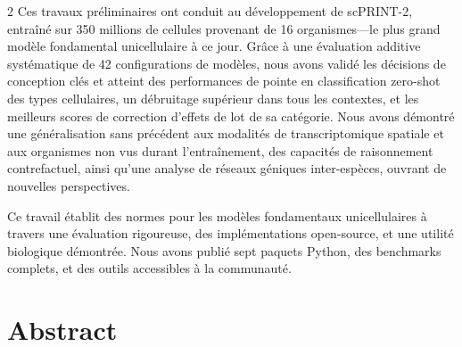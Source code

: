 \begin{mdframed}
\begin{small}
\begin{multicols}{2}
Ces travaux préliminaires ont conduit au développement de scPRINT-2, entraîné sur 350 millions de cellules provenant de 16 organismes—le plus grand modèle fondamental unicellulaire à ce jour. Grâce à une évaluation additive systématique de 42 configurations de modèles, nous avons validé les décisions de conception clés et atteint des performances de pointe en classification zero-shot des types cellulaires, un débruitage supérieur dans tous les contextes, et les meilleurs scores de correction d'effets de lot de sa catégorie. Nous avons démontré une généralisation sans précédent aux modalités de transcriptomique spatiale et aux organismes non vus durant l'entraînement, des capacités de raisonnement contrefactuel, ainsi qu'une analyse de réseaux géniques inter-espèces, ouvrant de nouvelles perspectives. 

Ce travail établit des normes pour les modèles fondamentaux unicellulaires à travers une évaluation rigoureuse, des implémentations open-source, et une utilité biologique démontrée. Nous avons publié sept paquets Python, des benchmarks complets, et des outils accessibles à la communauté.
\end{multicols}

\end{small}
\end{mdframed}


\chapter*{Abstract}

